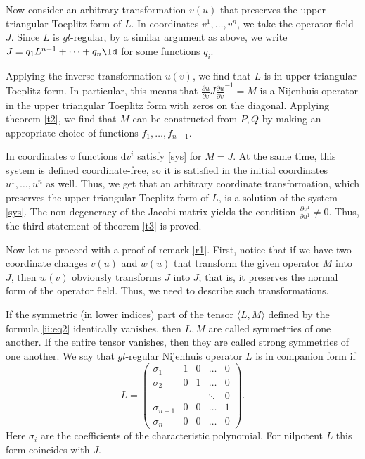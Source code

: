 \documentclass[12pt]{article}
\theoremstyle{remark}
\newcommand{\ddd}{\mathrm{d}}
\newcommand{\pd}[2]{\frac{\partial#1}{\partial#2}}
\begin{document}
Now consider an arbitrary transformation $v(u)$ that preserves the upper triangular Toeplitz form of $L$. In coordinates $v^1, \dots, v^n$, we take the operator field $J$. Since $L$ is $gl$-regular, by a similar argument as above, we write $J = q_1 L^{n - 1} + \dots + q_n \Id$ for some functions $q_i$. 

Applying the inverse transformation $u(v)$, we find that $L$ is in upper triangular Toeplitz form. In particular, this means that $\pd{u}{v} J \pd{u}{v}^{-1} = M$ is a Nijenhuis operator in the upper triangular Toeplitz form with zeros on the diagonal. Applying theorem \ref{t2}, we find that $M$ can be constructed from $P, Q$ by making an appropriate choice of functions $f_1, \dots, f_{n - 1}$.

In coordinates $v$ functions $\ddd v^i$ satisfy \eqref{sys} for $M = J$. At the same time, this system is defined coordinate-free, so it is satisfied in the initial coordinates $u^1, \dots, u^n$ as well. Thus, we get that an arbitrary coordinate transformation, which preserves the upper triangular Toeplitz form of $L$, is a solution of the system \eqref{sys}. The non-degeneracy of the Jacobi matrix yields the condition $\pd{v^1}{u^1} \neq 0$. Thus, the third statement of theorem \ref{t3} is proved.

Now let us proceed with a proof of remark \eqref{r1}. First, notice that if we have two coordinate changes $v(u)$ and $w(u)$ that transform the given operator $M$ into $J$, then $w(v)$ obviously transforms $J$ into $J$; that is, it preserves the normal form of the operator field. Thus, we need to describe such transformations.

If the symmetric (in lower indices) part of the tensor $\langle L, M \rangle$ defined by the formula \eqref{ii:eq2} identically vanishes, then $L, M$ are called symmetries of one another. If the entire tensor vanishes, then they are called strong symmetries of one another. We say that $gl$-regular Nijenhuis operator $L$ is in companion form if
$$
L = \left(\begin{array}{ccccc}
     \sigma_1 & 1 & 0 & \dots & 0  \\
     \sigma_2 & 0 & 1 & \dots & 0  \\
     & & & \ddots & 0 \\
     \sigma_{n - 1} & 0 & 0 & \dots & 1 \\
     \sigma_n & 0 & 0 & \dots & 0
\end{array}\right).
$$
Here $\sigma_i$ are the coefficients of the characteristic polynomial. For nilpotent $L$ this form coincides with $J$.
\end{document}
